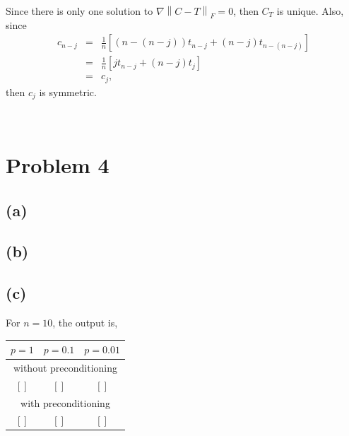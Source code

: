 \documentclass[11pt]{article}
\newcommand{\norm}[1]{\left\lVert#1\right\rVert}
\theoremstyle{definition}
\theoremstyle{remark}
\newcommand{\newquestion}{\hrulefill\vspace{-0.8\baselineskip}\\\null\hrulefill\vspace{-1.0\baselineskip}}
\newcommand{\newpart}{\vspace{-0.5\baselineskip}\hrulefill\vspace{-1.3\baselineskip}}
\theoremstyle{plain}
\begin{document}
Since there is only one solution to $\nabla\norm{C-T}_F=0$, then $C_T$ is unique. Also, since
\begin{eqnarray*}
  c_{n-j}&=&\frac{1}{n}\left[\left(n-\left(n-j\right)\right)t_{n-j}+\left(n-j\right)t_{n-\left(n-j\right)}\right]\\
     &=&\frac{1}{n}\left[jt_{n-j}+\left(n-j\right)t_j\right]\\
     &=&c_j,
\end{eqnarray*}
then $c_j$ is symmetric.

\newpage
\newquestion
%
%
\section*{Problem 4}

\newpart
\subsection*{(a)}


\newpart
\subsection*{(b)}


\newpage
\newpart
\subsection*{(c)}

\newpage
For $n=10$, the output is,

\begin{tabular}{c|c|c}
  $p=1$&$p=0.1$&$p=0.01$\\\hline
  \multicolumn{3}{c}{without preconditioning}\\\hline
  $\left[\right]$&$\left[\right]$&$\left[\right]$\\\hline
  \multicolumn{3}{c}{with preconditioning}\\\hline
  $\left[\right]$&$\left[\right]$&$\left[\right]$\\
\end{tabular}
\end{document}

